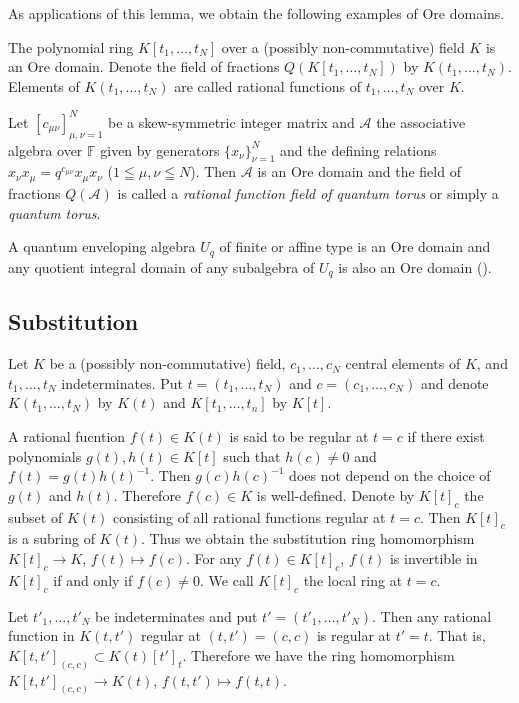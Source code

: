 \documentclass[12pt,a4paper]{article}
\newcommand\A{{\mathcal A}}
\newcommand\F{{\mathbb F}} %
\theoremstyle{plain} %
\theoremstyle{definition} %
\theoremstyle{definition} %
\numberwithin{theorem}{section}
\numberwithin{equation}{section}
\numberwithin{figure}{section}
\numberwithin{table}{section}
\begin{document}
As applications of this lemma, 
we obtain the following examples of Ore domains.

The polynomial ring $K[t_1,\ldots,t_N]$ over 
a (possibly non-commutative) field $K$ is an Ore domain. 
Denote the field of fractions $Q(K[t_1,\ldots,t_N])$ by $K(t_1,\ldots,t_N)$.
Elements of $K(t_1,\ldots,t_N)$ are called rational functions
of $t_1,\ldots,t_N$ over $K$.

Let $[c_{\mu\nu}]_{\mu,\nu=1}^N$ be a skew-symmetric integer matrix
and $\A$ the associative algebra over $\F$ given by 
generators $\{x_\nu\}_{\nu=1}^N$ and the defining relations
$x_\nu x_\mu = q^{c_{\mu\nu}}x_\mu x_\nu$ ($1\leqq\mu,\nu\leqq N$).
Then $\A$ is an Ore domain
and the field of fractions $Q(\A)$ is called 
a {\em rational function field of quantum torus}
or simply a {\em quantum torus}.

A quantum enveloping algebra $U_q$ 
of finite or affine type is an Ore domain and 
any quotient integral domain of any subalgebra of $U_q$
is also an Ore domain (\cite{kuroki-2008}).

\subsection{Substitution}
\label{sec:erh}

Let $K$ be a (possibly non-commutative) field, 
$c_1,\ldots,c_N$ central elements of $K$,
and $t_1,\ldots,t_N$ indeterminates.
Put $t=(t_1,\ldots,t_N)$ and $c=(c_1,\ldots,c_N)$ and
denote $K(t_1,\ldots,t_N)$ by $K(t)$ and $K[t_1,\ldots,t_n]$ by $K[t]$.

A rational fucntion $f(t)\in K(t)$ is said to be regular at $t=c$ 
if there exist polynomials $g(t),h(t)\in K[t]$ 
such that $h(c)\ne 0$ and $f(t)=g(t)h(t)^{-1}$.
Then $g(c)h(c)^{-1}$ does not depend on the choice of $g(t)$ and $h(t)$.
Therefore $f(c)\in K$ is well-defined.
Denote by $K[t]_c$ the subset of $K(t)$ consisting of 
all rational functions regular at $t=c$.
Then $K[t]_c$ is a subring of $K(t)$.
Thus we obtain the substitution ring homomorphism 
$K[t]_c\to K$, $f(t)\mapsto f(c)$.
For any $f(t)\in K[t]_c$, $f(t)$ is invertible in $K[t]_c$ 
if and only if $f(c)\ne 0$.
We call $K[t]_c$ the local ring at $t=c$.

Let $t'_1,\ldots,t'_N$ be indeterminates and put $t'=(t'_1,\ldots,t'_N)$.
Then any rational function in $K(t,t')$ regular at $(t,t')=(c,c)$ is
regular at $t'=t$. That is, $K[t,t']_{(c,c)}\subset K(t)[t']_{t}$.
Therefore we have the ring homomorphism $K[t,t']_{(c,c)}\to K(t)$, 
$f(t,t')\mapsto f(t,t)$.
\end{document}
